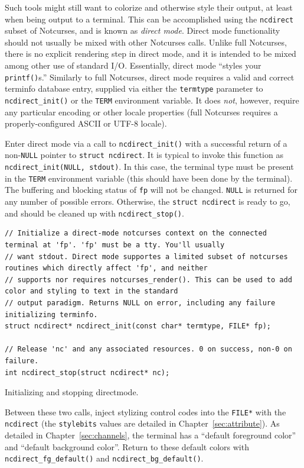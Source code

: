 \documentclass[letterpaper,10pt]{article}
\begin{document}
 Such tools might still want to colorize and otherwise style their output, at
least when being output to a terminal. This can be accomplished using the
\texttt{ncdirect} subset of Notcurses, and is known as \textit{direct mode}. Direct
mode functionality should not usually be mixed with other Notcurses calls.
Unlike full Notcurses, there is no explicit rendering step in direct mode, and
it is intended to be mixed among other use of standard I/O. Essentially, direct
mode ``styles your \texttt{printf()}s.'' Similarly to full Notcurses, direct mode
requires a valid and correct terminfo database entry, supplied via either the
\texttt{termtype} parameter to \texttt{ncdirect\_init()} or the \texttt{TERM} environment
variable. It does \textit{not}, however, require any particular encoding or
other locale properties\cite{setlocale} (full Notcurses requires a
properly-configured ASCII or UTF-8 locale).

Enter direct mode via a call to \texttt{ncdirect\_init()} with a successful
return of a non-\texttt{NULL} pointer to \texttt{struct ncdirect}. It is
typical to invoke this function as \texttt{ncdirect\_init(NULL, stdout)}. In this case, the terminal type must be present in the
\texttt{TERM} environment variable (this should have been done by the
terminal). The buffering and blocking status of \texttt{fp} will not be
changed. \texttt{NULL} is returned for any number of possible errors.
Otherwise, the \texttt{struct ncdirect} is ready to go, and should be cleaned
up with \texttt{ncdirect\_stop()}.

\begin{listing}[!htb]
\begin{verbatim}
// Initialize a direct-mode notcurses context on the connected terminal at 'fp'. 'fp' must be a tty. You'll usually
// want stdout. Direct mode supportes a limited subset of notcurses routines which directly affect 'fp', and neither
// supports nor requires notcurses_render(). This can be used to add color and styling to text in the standard
// output paradigm. Returns NULL on error, including any failure initializing terminfo.
struct ncdirect* ncdirect_init(const char* termtype, FILE* fp);

// Release 'nc' and any associated resources. 0 on success, non-0 on failure.
int ncdirect_stop(struct ncdirect* nc);
\end{verbatim}
\caption{Initializing and stopping directmode.}
\end{listing}

Between these two calls, inject stylizing control codes into the \texttt{FILE*} with
the \texttt{ncdirect} (the \texttt{stylebits} values are detailed in Chapter~\ref{sec:attribute}).
As detailed in Chapter~\ref{sec:channels}, the terminal has a ``default foreground color''
and ``default background color''. Return to these default colors with
\texttt{ncdirect\_fg\_default()} and \texttt{ncdirect\_bg\_default()}.
\end{document}
